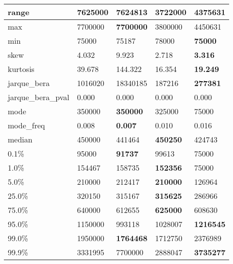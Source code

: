 \begin{table}[H]
\begin{tabular}{|l|m{10em}|m{10em}|m{10em}|m{10em}|}
\hline range & 7625000 & \bfseries 7624813 & \cellcolor[rgb]{0.9, 0.54, 0.52} 3722000 & 4375631 \\
\hline max & 7700000 & \bfseries 7700000 & \cellcolor[rgb]{0.9, 0.54, 0.52} 3800000 & 4450631 \\
\hline min & 75000 & 75187 & \cellcolor[rgb]{0.9, 0.54, 0.52} 78000 & \bfseries 75000 \\
\hline skew & 4.032 & \cellcolor[rgb]{0.9, 0.54, 0.52} 9.923 & 2.718 & \bfseries 3.316 \\
\hline kurtosis & 39.678 & \cellcolor[rgb]{0.9, 0.54, 0.52} 144.322 & 16.354 & \bfseries 19.249 \\
\hline jarque\_bera & 1016020 & \cellcolor[rgb]{0.9, 0.54, 0.52} 18340185 & 187216 & \bfseries 277381 \\
\hline jarque\_bera\_pval & 0.000 & 0.000 & 0.000 & 0.000 \\
\hline mode & 350000 & \bfseries 350000 & 325000 & \cellcolor[rgb]{0.9, 0.54, 0.52} 75000 \\
\hline mode\_freq & 0.008 & \bfseries 0.007 & 0.010 & \cellcolor[rgb]{0.9, 0.54, 0.52} 0.016 \\
\hline median & 450000 & 441464 & \bfseries 450250 & \cellcolor[rgb]{0.9, 0.54, 0.52} 424743 \\
\hline 0.1\% & 95000 & \bfseries 91737 & 99613 & \cellcolor[rgb]{0.9, 0.54, 0.52} 75000 \\
\hline 1.0\% & 154467 & 158735 & \bfseries 152356 & \cellcolor[rgb]{0.9, 0.54, 0.52} 75000 \\
\hline 5.0\% & 210000 & 212417 & \bfseries 210000 & \cellcolor[rgb]{0.9, 0.54, 0.52} 126964 \\
\hline 25.0\% & 320150 & 315167 & \bfseries 315625 & \cellcolor[rgb]{0.9, 0.54, 0.52} 286966 \\
\hline 75.0\% & 640000 & 612655 & \bfseries 625000 & \cellcolor[rgb]{0.9, 0.54, 0.52} 608630 \\
\hline 95.0\% & 1150000 & \cellcolor[rgb]{0.9, 0.54, 0.52} 993118 & 1028007 & \bfseries 1216545 \\
\hline 99.0\% & 1950000 & \bfseries 1764468 & 1712750 & \cellcolor[rgb]{0.9, 0.54, 0.52} 2376989 \\
\hline 99.9\% & 3331995 & \cellcolor[rgb]{0.9, 0.54, 0.52} 7700000 & 2888047 & \bfseries 3735277 \\
\hline
\end{tabular}
\end{table}
